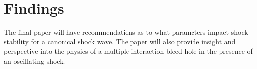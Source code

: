 
\section{Findings}


The final paper will have recommendations as to what parameters impact shock stability for a canonical shock wave. The paper will also provide insight and perspective into the physics of a multiple-interaction bleed hole in the presence of an oscillating shock.
